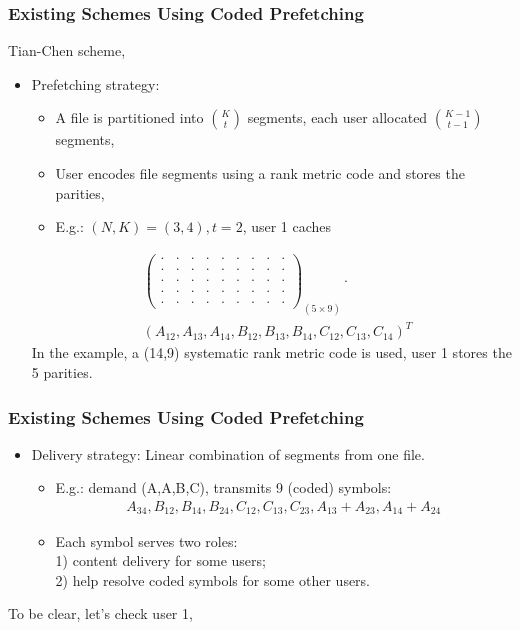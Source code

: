 \documentclass{beamer}
\begin{document}
\begin{frame}
\frametitle{Existing Schemes Using Coded Prefetching}
Tian-Chen scheme\footnotemark[1],
\begin{itemize}
\item Prefetching strategy: 
	\begin{itemize}
	[circle]
	\item A file is partitioned into $\binom{K}{t}$ segments, each user allocated $\binom{K-1}{t-1}$ segments,
	\item User encodes file segments using a rank metric code and stores the parities,
	\item E.g.: $(N,K) = (3,4), t = 2$, user 1 caches
	\end{itemize}
\begin{align*}
& \begin{pmatrix}
    \cdot   & \cdot  & \cdot  & \cdot &\cdot   & \cdot  & \cdot  & \cdot & \cdot \\
    \cdot   & \cdot  & \cdot  & \cdot &\cdot   & \cdot  & \cdot  & \cdot & \cdot \\
   \cdot   & \cdot  & \cdot  & \cdot &\cdot   & \cdot  & \cdot  & \cdot & \cdot \\
    \cdot   & \cdot  & \cdot  & \cdot &\cdot   & \cdot  & \cdot  & \cdot & \cdot \\
    \cdot   & \cdot  & \cdot  & \cdot &\cdot   & \cdot  & \cdot  & \cdot & \cdot 
\end{pmatrix}_{(5 \times 9)}
\cdot \\
& (A_{12},A_{13},A_{14},B_{12},B_{13},B_{14},C_{12},C_{13},C_{14})^T
\end{align*}
In the example, a (14,9) systematic rank metric code is used, user 1 stores the 5 parities.
\end{itemize}
\end{frame}


\begin{frame}
\frametitle{Existing Schemes Using Coded Prefetching}
\begin{itemize}
\item Delivery strategy: Linear combination of segments from one file.
\begin{itemize}
	[circle]
	\item E.g.: demand (A,A,B,C), transmits 9 (coded) symbols:
	\begin{align*}
	A_{34}, B_{12}, B_{14}, B_{24}, C_{12},C_{13},C_{23},A_{13}+A_{23},A_{14}+A_{24}
	\end{align*}
	\item Each symbol serves two roles: \\
	1) content delivery for some users; \\
	2) help resolve coded symbols for some other users. 
	\end{itemize}
\end{itemize}
To be clear, let's check user 1,
\end{frame}
\end{document}
